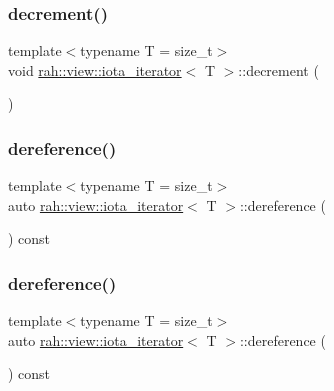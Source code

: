 \subsubsection{\texorpdfstring{decrement()}{decrement()}\hspace{0.1cm}{\footnotesize\ttfamily [2/2]}}
{\footnotesize\ttfamily template$<$typename T  = size\+\_\+t$>$ \\
void \mbox{\hyperlink{structrah_1_1view_1_1iota__iterator}{rah\+::view\+::iota\+\_\+iterator}}$<$ T $>$\+::decrement (\begin{DoxyParamCaption}{ }\end{DoxyParamCaption})\hspace{0.3cm}{\ttfamily [inline]}}

\mbox{\label{structrah_1_1view_1_1iota__iterator_ae31c733c52f77c7c199802db6638541d}} 
\subsubsection{\texorpdfstring{dereference()}{dereference()}\hspace{0.1cm}{\footnotesize\ttfamily [1/2]}}
{\footnotesize\ttfamily template$<$typename T  = size\+\_\+t$>$ \\
auto \mbox{\hyperlink{structrah_1_1view_1_1iota__iterator}{rah\+::view\+::iota\+\_\+iterator}}$<$ T $>$\+::dereference (\begin{DoxyParamCaption}{ }\end{DoxyParamCaption}) const\hspace{0.3cm}{\ttfamily [inline]}}

\mbox{\label{structrah_1_1view_1_1iota__iterator_ae31c733c52f77c7c199802db6638541d}} 
\subsubsection{\texorpdfstring{dereference()}{dereference()}\hspace{0.1cm}{\footnotesize\ttfamily [2/2]}}
{\footnotesize\ttfamily template$<$typename T  = size\+\_\+t$>$ \\
auto \mbox{\hyperlink{structrah_1_1view_1_1iota__iterator}{rah\+::view\+::iota\+\_\+iterator}}$<$ T $>$\+::dereference (\begin{DoxyParamCaption}{ }\end{DoxyParamCaption}) const\hspace{0.3cm}{\ttfamily [inline]}}

